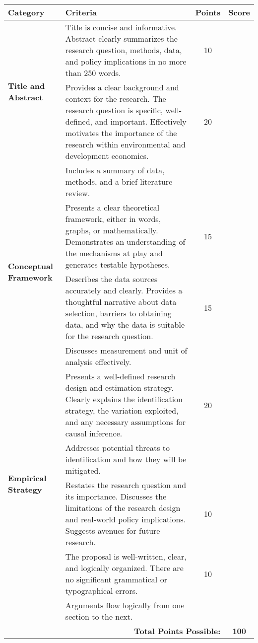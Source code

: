 \documentclass[
]{article}
\begin{document}
\begin{table}[h!]
\centering
\begin{tabular}{|l|p{8cm}|c|c|}
\hline
\textbf{Category} & \textbf{Criteria} & \textbf{Points} & \textbf{Score} \\
\hline
\multirow{2}{*}{\textbf{Title and Abstract}} & Title is concise and informative. Abstract clearly summarizes the research question, methods, data, and policy implications in no more than 250 words. & 10 & \\
\hline
\multirow{4}{*}{\textbf{Introduction}} & Provides a clear background and context for the research. The research question is specific, well-defined, and important. Effectively motivates the importance of the research within environmental and development economics. & 20 & \\
\cline{2-4}
& Includes a summary of data, methods, and a brief literature review. & & \\
\hline
\multirow{2}{*}{\textbf{Conceptual Framework}} & Presents a clear theoretical framework, either in words, graphs, or mathematically. Demonstrates an understanding of the mechanisms at play and generates testable hypotheses. & 15 & \\
\hline
\multirow{4}{*}{\textbf{Data Description}} & Describes the data sources accurately and clearly. Provides a thoughtful narrative about data selection, barriers to obtaining data, and why the data is suitable for the research question. & 15 & \\
\cline{2-4}
& Discusses measurement and unit of analysis effectively. & & \\
\hline
\multirow{4}{*}{\textbf{Empirical Strategy}} & Presents a well-defined research design and estimation strategy. Clearly explains the identification strategy, the variation exploited, and any necessary assumptions for causal inference. & 20 & \\
\cline{2-4}
& Addresses potential threats to identification and how they will be mitigated. & & \\
\hline
\multirow{2}{*}{\textbf{Conclusion}} & Restates the research question and its importance. Discusses the limitations of the research design and real-world policy implications. Suggests avenues for future research. & 10 & \\
\hline
\multirow{3}{*}{\textbf{Writing and Organization}} & The proposal is well-written, clear, and logically organized. There are no significant grammatical or typographical errors. & 10 & \\
\cline{2-4}
& Arguments flow logically from one section to the next. & & \\
\hline
\multicolumn{3}{|r|}{\textbf{Total Points Possible:}} & \textbf{100} \\
\hline
\end{tabular}
\end{table}
\end{document}
